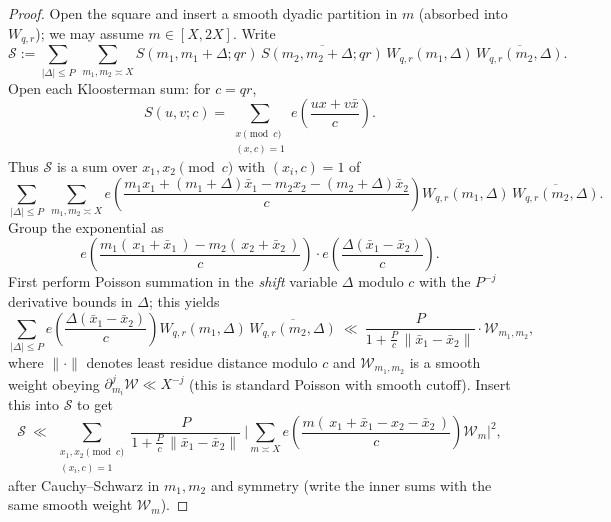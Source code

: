 \documentclass[11pt]{article}
\theoremstyle{definition}
\theoremstyle{remark}
\numberwithin{equation}{part}
\begin{document}
\begin{proof}
	Open the square and insert a smooth dyadic partition in $m$ (absorbed into $W_{q,r}$); we may assume $m\in[X,2X]$. Write
	\[
		\mathcal S := \sum_{|\Delta|\le P}\ \sum_{m_1,m_2\asymp X}
		S(m_1,m_1+\Delta;qr)\, \overline{S(m_2,m_2+\Delta;qr)}\,
		W_{q,r}(m_1,\Delta)\,\overline{W_{q,r}(m_2,\Delta)}.
	\]
	Open each Kloosterman sum: for $c=qr$,
	\[
		S(u,v;c)=\sum_{\substack{x\!\!\!\pmod c\\(x,c)=1}} e\!\left(\frac{ux+v\bar x}{c}\right).
	\]
	Thus $\mathcal S$ is a sum over $x_1,x_2\!\!\pmod c$ with $(x_i,c)=1$ of
	\[
		\sum_{|\Delta|\le P}\ \sum_{m_1,m_2\asymp X}
		e\!\left(\frac{m_1 x_1+(m_1+\Delta)\bar x_1 - m_2 x_2-(m_2+\Delta)\bar x_2}{c}\right)
		W_{q,r}(m_1,\Delta)\,\overline{W_{q,r}(m_2,\Delta)}.
	\]
	Group the exponential as
	\[
		e\!\left(\frac{m_1(\,x_1+\bar x_1\,)-m_2(\,x_2+\bar x_2\,)}{c}\right)\cdot
		e\!\left(\frac{\Delta(\bar x_1-\bar x_2)}{c}\right).
	\]
	First perform Poisson summation in the \emph{shift} variable $\Delta$ modulo $c$ with the $P^{-j}$ derivative bounds in $\Delta$; this yields
	\[
		\sum_{|\Delta|\le P} e\!\left(\frac{\Delta(\bar x_1-\bar x_2)}{c}\right) W_{q,r}(m_1,\Delta)\,\overline{W_{q,r}(m_2,\Delta)}
		\ \ll\ \frac{P}{1+ \frac{P}{c}\, \| \bar x_1-\bar x_2\|}\cdot \mathcal W_{m_1,m_2},
	\]
	where $\|\cdot\|$ denotes least residue distance modulo $c$ and $\mathcal W_{m_1,m_2}$ is a smooth weight obeying $\partial_{m_i}^j\mathcal W\ll X^{-j}$ (this is standard Poisson with smooth cutoff). Insert this into $\mathcal S$ to get
	\[
		\mathcal S\ \ll\ \sum_{\substack{x_1,x_2\!\!\pmod c\\(x_i,c)=1}}
		\frac{P}{1+ \frac{P}{c}\, \| \bar x_1-\bar x_2\|}\
		\Bigg|\sum_{m\asymp X} e\!\left(\frac{m(\,x_1+\bar x_1 - x_2-\bar x_2\,)}{c}\right)\mathcal W_{m}\Bigg|^2,
	\]
	after Cauchy--Schwarz in $m_1,m_2$ and symmetry (write the inner sums with the same smooth weight $\mathcal W_m$).


\end{proof}
\end{document}
